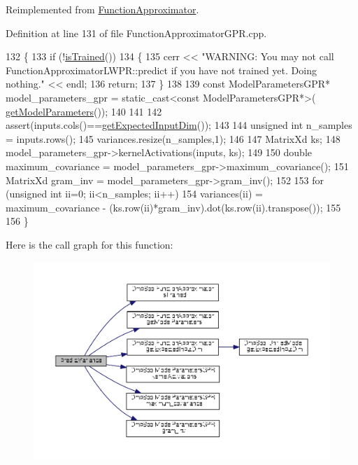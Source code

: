 Reimplemented from \hyperlink{classDmpBbo_1_1FunctionApproximator_ae7931f49eb4d095e1c007edcbad58684}{Function\+Approximator}.



Definition at line 131 of file Function\+Approximator\+G\+P\+R.\+cpp.


\begin{DoxyCode}
132 \{
133   \textcolor{keywordflow}{if} (!\hyperlink{classDmpBbo_1_1FunctionApproximator_a178135f623d9b9058870851a53299c6e}{isTrained}())  
134   \{
135     cerr << \textcolor{stringliteral}{"WARNING: You may not call FunctionApproximatorLWPR::predict if you have not trained yet. Doing
       nothing."} << endl;
136     \textcolor{keywordflow}{return};
137   \}
138 
139   \textcolor{keyword}{const} ModelParametersGPR* model\_parameters\_gpr = \textcolor{keyword}{static\_cast<}\textcolor{keyword}{const }ModelParametersGPR*\textcolor{keyword}{>}(
      \hyperlink{classDmpBbo_1_1FunctionApproximator_a0e7e116ed9b159d782fca544dacb4bac}{getModelParameters}());
140   
141   
142   assert(inputs.cols()==\hyperlink{classDmpBbo_1_1FunctionApproximator_af5a550bcf65d5a29a153a594cc4e3fa1}{getExpectedInputDim}());
143   
144   \textcolor{keywordtype}{unsigned} \textcolor{keywordtype}{int} n\_samples = inputs.rows();
145   variances.resize(n\_samples,1);
146   
147   MatrixXd ks;
148   model\_parameters\_gpr->kernelActivations(inputs, ks);  
149 
150   \textcolor{keywordtype}{double} maximum\_covariance = model\_parameters\_gpr->maximum\_covariance();
151   MatrixXd gram\_inv = model\_parameters\_gpr->gram\_inv();
152   
153   \textcolor{keywordflow}{for} (\textcolor{keywordtype}{unsigned} \textcolor{keywordtype}{int} ii=0; ii<n\_samples; ii++)
154     variances(ii) = maximum\_covariance - (ks.row(ii)*gram\_inv).dot(ks.row(ii).transpose());
155 
156 \}
\end{DoxyCode}


Here is the call graph for this function\+:
\nopagebreak
\begin{figure}[H]
\begin{center}
\leavevmode
\includegraphics[width=350pt]{classDmpBbo_1_1FunctionApproximatorGPR_a81bcaa6c544bee98c1c625c81860fe4c_cgraph}
\end{center}
\end{figure}


